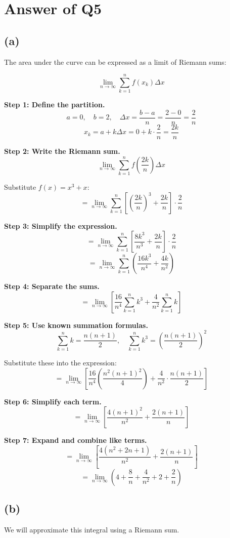 \documentclass{article}
\begin{document}
\section*{Answer of Q5}
\subsection*{(a)}
The area under the curve can be expressed as a limit of Riemann sums:

\[
\lim_{n \to \infty} \sum_{k=1}^{n} f(x_k) \Delta x
\]

\textbf{Step 1: Define the partition.}  
\[
a = 0, \quad b = 2, \quad \Delta x = \frac{b-a}{n} = \frac{2-0}{n} = \frac{2}{n}
\]
\[
x_k = a + k \Delta x = 0 + k \cdot \frac{2}{n} = \frac{2k}{n}
\]

\textbf{Step 2: Write the Riemann sum.}  
\[
\lim_{n \to \infty} \sum_{k=1}^{n} f\left( \frac{2k}{n} \right) \Delta x
\]

Substitute $f(x) = x^3 + x$:
\[
= \lim_{n \to \infty} \sum_{k=1}^{n} \left[ \left(\frac{2k}{n}\right)^3 + \frac{2k}{n} \right] \cdot \frac{2}{n}
\]

\textbf{Step 3: Simplify the expression.}
\[
= \lim_{n \to \infty} \sum_{k=1}^{n} \left[ \frac{8k^3}{n^3} + \frac{2k}{n} \right] \cdot \frac{2}{n}
\]
\[
= \lim_{n \to \infty} \sum_{k=1}^{n} \left( \frac{16k^3}{n^4} + \frac{4k}{n^2} \right)
\]

\textbf{Step 4: Separate the sums.}
\[
= \lim_{n \to \infty} \left[ \frac{16}{n^4} \sum_{k=1}^{n} k^3 + \frac{4}{n^2} \sum_{k=1}^{n} k \right]
\]

\textbf{Step 5: Use known summation formulas.}
\[
\sum_{k=1}^{n} k = \frac{n(n+1)}{2}, \quad \sum_{k=1}^{n} k^3 = \left( \frac{n(n+1)}{2} \right)^2
\]

Substitute these into the expression:
\[
= \lim_{n \to \infty} \left[ \frac{16}{n^4} \left( \frac{n^2(n+1)^2}{4} \right) + \frac{4}{n^2} \cdot \frac{n(n+1)}{2} \right]
\]

\textbf{Step 6: Simplify each term.}
\[
= \lim_{n \to \infty} \left[ \frac{4(n+1)^2}{n^2} + \frac{2(n+1)}{n} \right]
\]

\textbf{Step 7: Expand and combine like terms.}
\[
= \lim_{n \to \infty} \left[ \frac{4(n^2 + 2n + 1)}{n^2} + \frac{2(n+1)}{n} \right]
\]
\[
= \lim_{n \to \infty} \left( 4 + \frac{8}{n} + \frac{4}{n^2} + 2 + \frac{2}{n} \right)
\]
\subsection*{(b)}
We will approximate this integral using a Riemann sum.
\end{document}
